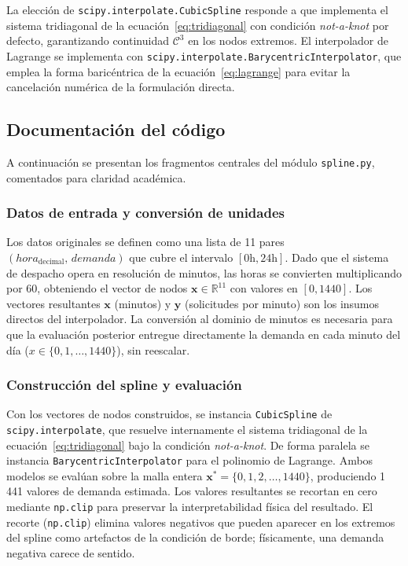 \documentclass[conference]{IEEEtran}
\begin{document}
La elección de \texttt{scipy.interpolate.CubicSpline} responde a que implementa el sistema tridiagonal de la ecuación~\eqref{eq:tridiagonal} con condición
\textit{not-a-knot} por defecto, garantizando continuidad $\mathcal{C}^3$ en los nodos extremos. El interpolador de Lagrange se implementa con
\texttt{scipy.interpolate.BarycentricInterpolator}, que emplea la forma baricéntrica de la ecuación~\eqref{eq:lagrange} para evitar la cancelación
numérica de la formulación directa.

\subsection{Documentación del código}

A continuación se presentan los fragmentos centrales del módulo \texttt{spline.py}, comentados para claridad académica.

\subsubsection{Datos de entrada y conversión de unidades}

Los datos originales se definen como una lista de 11 pares $(hora_{\text{decimal}},\, demanda)$ que cubre el intervalo $[0\text{h}, 24\text{h}]$. Dado que
el sistema de despacho opera en resolución de minutos, las horas se convierten multiplicando por 60, obteniendo el vector de nodos $\mathbf{x} \in
\mathbb{R}^{11}$ con valores en $[0, 1440]$. Los vectores resultantes $\mathbf{x}$ (minutos) y $\mathbf{y}$ (solicitudes por minuto) son los insumos
directos del interpolador. La conversión al dominio de minutos es necesaria para que la evaluación posterior entregue directamente la demanda en cada
minuto del día ($x \in \{0, 1, \ldots, 1440\}$), sin reescalar.

\subsubsection{Construcción del spline y evaluación}

Con los vectores de nodos construidos, se instancia \texttt{CubicSpline} de \texttt{scipy.interpolate}, que resuelve internamente el sistema tridiagonal
de la ecuación~\eqref{eq:tridiagonal} bajo la condición \textit{not-a-knot}. De forma paralela se instancia \texttt{BarycentricInterpolator} para el
polinomio de Lagrange. Ambos modelos se evalúan sobre la malla entera $\mathbf{x}^* = \{0, 1, 2, \ldots, 1440\}$, produciendo 1\,441 valores de demanda
estimada. Los valores resultantes se recortan en cero mediante \texttt{np.clip} para preservar la interpretabilidad física del resultado. El recorte
(\texttt{np.clip}) elimina valores negativos que pueden aparecer en los extremos del spline como artefactos de la condición de borde; físicamente, una
demanda negativa carece de sentido.
\end{document}
